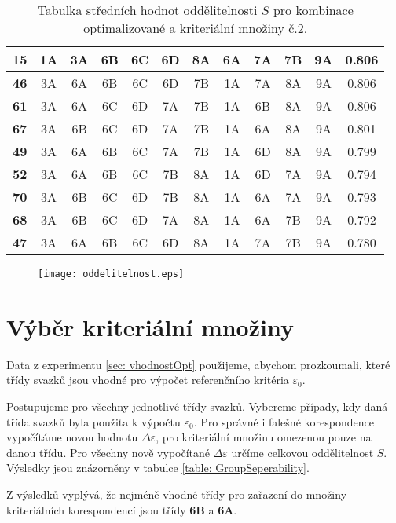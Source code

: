 \begin{table}
\begin{tabular}{|c||c|c|c|c|c|c||c|c|c|c||c|}
\hline
\textbf{15} & 1A & 3A & 6B & 6C & 6D & 8A & 6A & 7A & 7B & 9A & 0.806 \\
\hline
\textbf{46} & 3A & 6A & 6B & 6C & 6D & 7B & 1A & 7A & 8A & 9A & 0.806 \\
\hline
\textbf{61} & 3A & 6A & 6C & 6D & 7A & 7B & 1A & 6B & 8A & 9A & 0.806 \\
\hline
\textbf{67} & 3A & 6B & 6C & 6D & 7A & 7B & 1A & 6A & 8A & 9A & 0.801 \\
\hline
\textbf{49} & 3A & 6A & 6B & 6C & 7A & 7B & 1A & 6D & 8A & 9A & 0.799 \\
\hline
\textbf{52} & 3A & 6A & 6B & 6C & 7B & 8A & 1A & 6D & 7A & 9A & 0.794 \\
\hline
\textbf{70} & 3A & 6B & 6C & 6D & 7B & 8A & 1A & 6A & 7A & 9A & 0.793 \\
\hline
\textbf{68} & 3A & 6B & 6C & 6D & 7A & 8A & 1A & 6A & 7B & 9A & 0.792 \\
\hline
\textbf{47} & 3A & 6A & 6B & 6C & 6D & 8A & 1A & 7A & 7B & 9A & 0.780 \\
\hline
\end{tabular}
\caption{Tabulka středních hodnot oddělitelnosti $S$ pro kombinace optimalizované a kriteriální množiny č.2.}
\label{table: MeanSeperability2}
\end{table}

\begin{figure}[htps]
\centering
\texttt{[image: oddelitelnost.eps]}
\caption{}
\label{fig: oddelitelnost}
\end{figure}

\section{Výběr kriteriální množiny}
	Data z experimentu \ref{sec: vhodnostOpt} použijeme, abychom prozkoumali, které třídy svazků jsou vhodné pro výpočet referenčního kritéria $\varepsilon_0$.
	
	Postupujeme pro všechny jednotlivé třídy svazků. Vybereme případy, kdy daná třída svazků byla použita k výpočtu $\varepsilon_0$. Pro správné i falešné korespondence vypočítáme novou hodnotu $\Delta\varepsilon$, pro kriteriální množinu omezenou pouze na danou třídu. Pro všechny nově vypočítané $\Delta\varepsilon$ určíme celkovou oddělitelnost $S$. Výsledky jsou znázorněny v tabulce \ref{table: GroupSeperability}. 
	
	Z výsledků vyplývá, že nejméně vhodné třídy pro zařazení do množiny kriteriálních korespondencí jsou třídy \textbf{6B} a \textbf{6A}. 

